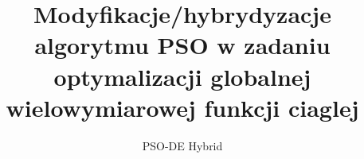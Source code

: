 \documentclass{sig-alternate}
\begin{document}
%

\title{Modyfikacje/hybrydyzacje algorytmu PSO w zadaniu optymalizacji globalnej wielowymiarowej funkcji ciaglej
}
\subtitle{PSO-DE Hybrid
}

%
%
%
%
%
\end{document}
